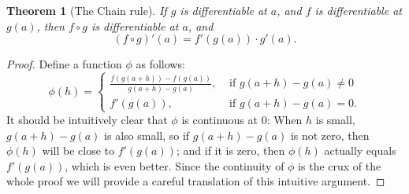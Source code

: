 \documentclass{article}
\newtheorem{theorem}{Theorem}
\begin{document}
\begin{theorem}[The Chain rule]
  If $g$ is differentiable at $a$, and $f$ is differentiable at $g(a)$, then $f
  \circ g$ is differentiable at $a$, and \begin{equation*}
    (f \circ g)'(a) = f'(g(a)) \cdot g'(a).
  \end{equation*}
\end{theorem}

\begin{proof}
  Define a function $\phi$ as follows: \begin{equation*}
    \phi(h) = \begin{cases}
      \frac{f(g(a + h)) - f(g(a))}{g(a + h) - g(a)}, &\text{ if } g(a + h) -
        g(a) \neq 0 \\
      f'(g(a)), &\text{ if } g(a + h) - g(a) = 0.
    \end{cases}
  \end{equation*}
  It should be intuitively clear that $\phi$ is continuous at 0: When $h$ is
  small, $g(a + h) - g(a)$ is also small, so if $g(a + h) - g(a)$ is not zero,
  then $\phi(h)$ will be close to $f'(g(a))$; and if it is zero, then $\phi(h)$
  actually equals $f'(g(a))$, which is even better. Since the continuity of
  $\phi$ is the crux of the whole proof we will provide a careful translation
  of this intuitive argument.


\end{proof}
\end{document}
